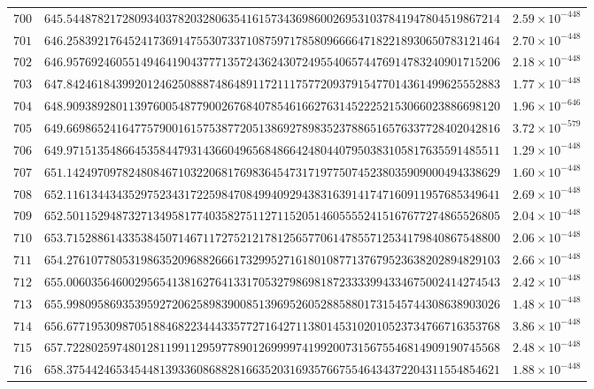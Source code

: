 \documentclass[12pt,reqno]{amsart}
\theoremstyle{remark}
\begin{document}
\begin{longtable}{clc}
$700$ & $645.5448782172809340378203280635416157343698600269531037841947804519867214$ & $2.59\times 10^{-448}$ \\
$701$ & $646.2583921764524173691475530733710875971785809666647182218930650783121464$ & $2.70\times 10^{-448}$ \\
$702$ & $646.9576924605514946419043777135724362430724955406574476914783240901715206$ & $2.18\times 10^{-448}$ \\
$703$ & $647.8424618439920124625088874864891172111757720937915477014361499625552883$ & $1.77\times 10^{-448}$ \\
$704$ & $648.9093892801139760054877900267684078546166276314522252153066023886698120$ & $1.96\times 10^{-646}$ \\
$705$ & $649.6698652416477579001615753877205138692789835237886516576337728402042816$ & $3.72\times 10^{-579}$ \\
$706$ & $649.9715135486645358447931436604965684866424804407950383105817635591485511$ & $1.29\times 10^{-448}$ \\
$707$ & $651.1424970978248084671032206817698364547317197750745238035909000494338629$ & $1.60\times 10^{-448}$ \\
$708$ & $652.1161344343529752343172259847084994092943831639141747160911957685349641$ & $2.69\times 10^{-448}$ \\
$709$ & $652.5011529487327134958177403582751127115205146055552415167677274865526805$ & $2.04\times 10^{-448}$ \\
$710$ & $653.7152886143353845071467117275212178125657706147855712534179840867548800$ & $2.06\times 10^{-448}$ \\
$711$ & $654.2761077805319863520968826661732995271618010877137679523638202894829103$ & $2.66\times 10^{-448}$ \\
$712$ & $655.0060356460029565413816276413317053279869818723333994334675002414274543$ & $2.42\times 10^{-448}$ \\
$713$ & $655.9980958693539592720625898390085139695260528858801731545744308638903026$ & $1.48\times 10^{-448}$ \\
$714$ & $656.6771953098705188468223444335772716427113801453102010523734766716353768$ & $3.86\times 10^{-448}$ \\
$715$ & $657.7228025974801281199112959778901269999741992007315675546814909190745568$ & $2.48\times 10^{-448}$ \\
$716$ & $658.3754424653454481393360868828166352031693576675546434372204311554854621$ & $1.88\times 10^{-448}$ \\

\end{longtable}
\end{document}
